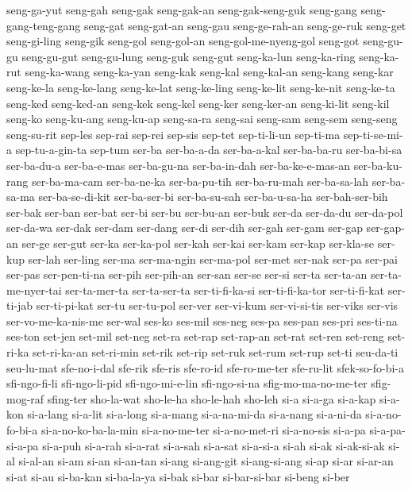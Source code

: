 {seng-ga-yut seng-gah seng-gak seng-gak-an seng-gak-seng-guk seng-gang
seng-gang-teng-gang seng-gat seng-gat-an seng-gau seng-ge-rah-an
seng-ge-ruk seng-get seng-gi-ling seng-gik seng-gol seng-gol-an
seng-gol-me-nyeng-gol seng-got seng-gu-gu seng-gu-gut seng-gu-lung
seng-guk seng-gut seng-ka-lun seng-ka-ring seng-ka-rut seng-ka-wang
seng-ka-yan seng-kak seng-kal seng-kal-an seng-kang seng-kar seng-ke-la
seng-ke-lang seng-ke-lat seng-ke-ling seng-ke-lit seng-ke-nit seng-ke-ta
seng-ked seng-ked-an seng-kek seng-kel seng-ker seng-ker-an seng-ki-lit
seng-kil seng-ko seng-ku-ang seng-ku-ap seng-sa-ra seng-sai seng-sam
seng-sem seng-seng seng-su-rit sep-les sep-rai sep-rei sep-sis sep-tet
sep-ti-li-un sep-ti-ma sep-ti-se-mi-a sep-tu-a-gin-ta sep-tum ser-ba
ser-ba-a-da ser-ba-a-kal ser-ba-ba-ru ser-ba-bi-sa ser-ba-du-a
ser-ba-e-mas ser-ba-gu-na ser-ba-in-dah ser-ba-ke-e-mas-an ser-ba-ku-rang
ser-ba-ma-cam ser-ba-ne-ka ser-ba-pu-tih ser-ba-ru-mah ser-ba-sa-lah
ser-ba-sa-ma ser-ba-se-di-kit ser-ba-ser-bi ser-ba-su-sah ser-ba-u-sa-ha
ser-bah-ser-bih ser-bak ser-ban ser-bat ser-bi ser-bu ser-bu-an ser-buk
ser-da ser-da-du ser-da-pol ser-da-wa ser-dak ser-dam ser-dang ser-di
ser-dih ser-gah ser-gam ser-gap ser-gap-an ser-ge ser-gut ser-ka
ser-ka-pol ser-kah ser-kai ser-kam ser-kap ser-kla-se ser-kup ser-lah
ser-ling ser-ma ser-ma-ngin ser-ma-pol ser-met ser-nak ser-pa ser-pai
ser-pas ser-pen-ti-na ser-pih ser-pih-an ser-san ser-se ser-si ser-ta
ser-ta-an ser-ta-me-nyer-tai ser-ta-mer-ta ser-ta-ser-ta ser-ti-fi-ka-si
ser-ti-fi-ka-tor ser-ti-fi-kat ser-ti-jab ser-ti-pi-kat ser-tu ser-tu-pol
ser-ver ser-vi-kum ser-vi-si-tis ser-viks ser-vis ser-vo-me-ka-nis-me
ser-wal ses-ko ses-mil ses-neg ses-pa ses-pan ses-pri ses-ti-na ses-ton
set-jen set-mil set-neg set-ra set-rap set-rap-an set-rat set-ren set-reng
set-ri-ka set-ri-ka-an set-ri-min set-rik set-rip set-ruk set-rum set-rup
set-ti seu-da-ti seu-lu-mat sfe-no-i-dal sfe-rik sfe-ris sfe-ro-id
sfe-ro-me-ter sfe-ru-lit sfek-so-fo-bi-a sfi-ngo-fi-li sfi-ngo-li-pid
sfi-ngo-mi-e-lin sfi-ngo-si-na sfig-mo-ma-no-me-ter sfig-mog-raf sfing-ter
sho-la-wat sho-le-ha sho-le-hah sho-leh si-a si-a-ga si-a-kap si-a-kon
si-a-lang si-a-lit si-a-long si-a-mang si-a-na-mi-da si-a-nang si-a-ni-da
si-a-no-fo-bi-a si-a-no-ko-ba-la-min si-a-no-me-ter si-a-no-met-ri
si-a-no-sis si-a-pa si-a-pa-si-a-pa si-a-puh si-a-rah si-a-rat si-a-sah
si-a-sat si-a-si-a si-ah si-ak si-ak-si-ak si-al si-al-an si-am si-an
si-an-tan si-ang si-ang-git si-ang-si-ang si-ap si-ar si-ar-an si-at si-au
si-ba-kan si-ba-la-ya si-bak si-bar si-bar-si-bar si-beng si-ber
}
